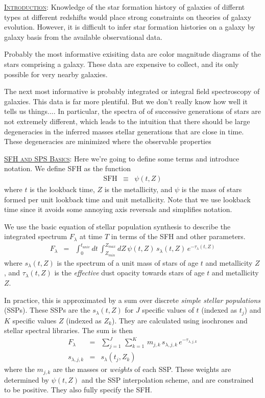 \documentclass{article}
\begin{document}
\vspace{0.15in}

\underline{\textsc{Introduction}}: 
Knowledge of the star formation history of galaxies of differnt types at different redshifts would place strong constraints on theories of galaxy evolution.
However, it is difficult to infer star formation histories on a galaxy by galaxy basis from the available observational data.

Probably the most informative exisiting data are color magnitude diagrams of the stars comprising a galaxy.
These data are expensive to collect, and its only possible for very nearby galaxies.

The next most informative is probably integrated or integral field spectroscopy of galaxies.
This data is far more plentiful.
But we don't really know how well it tells us things....
In particular, the spectra of of successive generations of stars are not extremely different, 
which leads to the intuition that there should be large degeneracies in the inferred masses stellar generations that are close in time.
These degeneracies are minimized where the observable properties

\vspace{0.15in}

\underline{\textsc{SFH and SPS Basics}}:
Here we're going to define some terms and introduce notation. We define SFH as the function 
\begin{eqnarray}
\mathrm{SFH} & \equiv & \psi(t, Z)
\end{eqnarray}
where $t$ is the lookback time,
$Z$ is the metallicity,
and $\psi$ is the mass of stars formed per unit lookback time and unit metallicity.
Note that we use lookback time since it avoids some annoying axis reversals and simplifies notation.

We use the basic equation of stellar population synthesis to describe the integrated spectrum $F_\lambda$ at time $T$ in terms of the SFH and other parameters.
\begin{eqnarray}
F_\lambda & = & \int_0^{t_{univ}} dt \, \int_{Z_{min}}^{Z_{max}} dZ \, \psi(t, Z) \, s_\lambda(t, Z) \, e^{-\tau_\lambda(t, Z)}
\end{eqnarray}
where $s_\lambda(t, Z)$ is the spectrum of a unit mass of stars of age $t$ and metallicity $Z$, and
$\tau_\lambda(t, Z)$ is the \emph{effective} dust opacity towards stars of age $t$ and metallicity $Z$.

In practice, this is approximated by a sum over discrete \emph{simple stellar populations} (SSPs).  
These SSPs are the $s_\lambda(t, Z)$ for $J$ specific values of $t$ (indexed as $t_j$) and $K$ specific values $Z$ (indexed as $Z_k$).
They are calculated using isochrones and stellar spectral libraries.
The sum is then
\begin{eqnarray}
F_\lambda & = & \sum_{j=1}^J \, \sum_{k=1}^{K} \, m_{j,k} \, s_{\lambda, j,k} \, e^{-\tau_{\lambda, j,k}} \\
s_{\lambda, j,k} & = & s_\lambda(t_j, Z_k)
\end{eqnarray}
where the $m_{j,k}$ are the masses or \emph{weights} of each SSP.  
These weights are determined by $\psi(t, Z)$ and the SSP interpolation scheme,  and are constrained to be positive.
They also fully specify the SFH.
\end{document}
